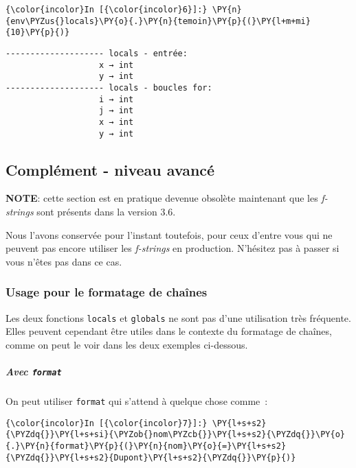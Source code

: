     \begin{Verbatim}[commandchars=\\\{\},frame=single,framerule=0.3mm,rulecolor=\color{cellframecolor}]
{\color{incolor}In [{\color{incolor}6}]:} \PY{n}{env\PYZus{}locals}\PY{o}{.}\PY{n}{temoin}\PY{p}{(}\PY{l+m+mi}{10}\PY{p}{)}
\end{Verbatim}


    \begin{Verbatim}[commandchars=\\\{\},frame=single,framerule=0.3mm,rulecolor=\color{cellframecolor}]
-------------------- locals - entrée:
                   x → int
                   y → int
-------------------- locals - boucles for:
                   i → int
                   j → int
                   x → int
                   y → int
\end{Verbatim}

    \hypertarget{compluxe9ment---niveau-avancuxe9}{%
\subsection{Complément - niveau
avancé}\label{compluxe9ment---niveau-avancuxe9}}

    \textbf{NOTE}: cette section est en pratique devenue obsolète maintenant
que les \emph{f-strings} sont présents dans la version 3.6.

Nous l'avons conservée pour l'instant toutefois, pour ceux d'entre vous
qui ne peuvent pas encore utiliser les \emph{f-strings} en production.
N'hésitez pas à passer si vous n'êtes pas dans ce cas.

    \hypertarget{usage-pour-le-formatage-de-chauxeenes}{%
\subsubsection{Usage pour le formatage de
chaînes}\label{usage-pour-le-formatage-de-chauxeenes}}

    Les deux fonctions \texttt{locals} et \texttt{globals} ne sont pas d'une
utilisation très fréquente. Elles peuvent cependant être utiles dans le
contexte du formatage de chaînes, comme on peut le voir dans les deux
exemples ci-dessous.

    \hypertarget{avec-format}{%
\subparagraph{\texorpdfstring{Avec
\texttt{format}}{Avec format}}\label{avec-format}}

    On peut utiliser \texttt{format} qui s'attend à quelque chose comme~:

    \begin{Verbatim}[commandchars=\\\{\},frame=single,framerule=0.3mm,rulecolor=\color{cellframecolor}]
{\color{incolor}In [{\color{incolor}7}]:} \PY{l+s+s2}{\PYZdq{}}\PY{l+s+si}{\PYZob{}nom\PYZcb{}}\PY{l+s+s2}{\PYZdq{}}\PY{o}{.}\PY{n}{format}\PY{p}{(}\PY{n}{nom}\PY{o}{=}\PY{l+s+s2}{\PYZdq{}}\PY{l+s+s2}{Dupont}\PY{l+s+s2}{\PYZdq{}}\PY{p}{)}
\end{Verbatim}


